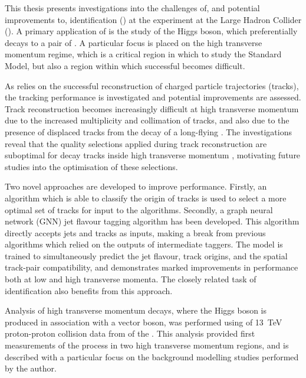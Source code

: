 
This thesis presents investigations into the challenges of, and potential improvements to, \bjet identification (\btagging) at the \ATLAS experiment at the Large Hadron Collider (\LHC).
A primary application of \btagging is the study of the Higgs boson, which preferentially decays to a pair of \bquarks.
A particular focus is placed on the high transverse momentum regime, which is a critical region in which to study the Standard Model, but also a region within which successful \btagging becomes difficult.

As \btagging relies on the successful reconstruction of charged particle trajectories (tracks), the tracking performance is investigated and potential improvements are assessed.
Track reconstruction becomes increasingly difficult at high transverse momentum due to the increased multiplicity and collimation of tracks, and also due to the presence of displaced tracks from the decay of a long-flying \bhadron.
The investigations reveal that the quality selections applied during track reconstruction are suboptimal for \bhadron decay tracks inside high transverse momentum \bjets, motivating future studies into the optimisation of these selections.

Two novel approaches are developed to improve \btagging performance.
Firstly, an algorithm which is able to classify the origin of tracks is used to select a more optimal set of tracks for input to the \btagging algorithms.
Secondly, a graph neural network (GNN) jet flavour tagging algorithm has been developed.
This algorithm directly accepts jets and tracks as inputs, making a break from previous algorithms which relied on the outputs of intermediate taggers.
The model is trained to simultaneously predict the jet flavour, track origins, and the spatial track-pair compatibility, and demonstrates marked improvements in \btagging performance both at low and high transverse momenta.
The closely related task of \cjet identification also benefits from this approach.

Analysis of high transverse momentum \Hbb decays, where the Higgs boson is produced in association with a vector boson, was performed using \intlumi of \SI{13}{\TeV} proton-proton collision data from \runtwo of the \LHC.
This analysis provided first measurements of the \VHbb process in two high transverse momentum regions, and is described with a particular focus on the background modelling studies performed by the author.